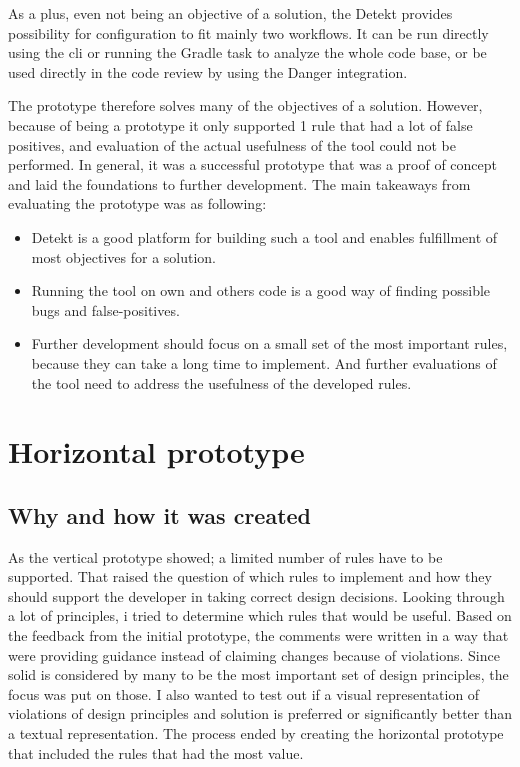 \documentclass{report}
\begin{document}
As a plus, even not being an objective of a solution, the Detekt provides possibility for configuration to fit mainly two workflows. It can be run directly using the \gls{cli} or running the Gradle task to analyze the whole code base, or be used directly in the code review by using the Danger integration.

The prototype therefore solves many of the objectives of a solution. However, because of being a prototype it only supported 1 rule that had a lot of false positives, and evaluation of the actual usefulness of the tool could not be performed. In general, it was a successful prototype that was a proof of concept and laid the foundations to further development. The main takeaways from evaluating the prototype was as following:
\begin{itemize}
    \item Detekt is a good platform for building such a tool and enables fulfillment of most objectives for a solution.
    \item Running the tool on own and others code is a good way of finding possible bugs and false-positives.
    \item Further development should focus on a small set of the most important rules, because they can take a long time to implement. And further evaluations of the tool need to address the usefulness of the developed rules.
\end{itemize}

\section{Horizontal prototype}

\subsection*{Why and how it was created}
As the vertical prototype showed; a limited number of rules have to be supported. That raised the question of which rules to implement and how they should support the developer in taking correct design decisions. Looking through a lot of principles, i tried to determine which rules that would be useful. Based on the feedback from the initial prototype, the comments were written in a way that were providing guidance instead of claiming changes because of violations. Since \gls{solid} is considered by many to be the most important set of design principles, the focus was put on those. I also wanted to test out if a visual representation of violations of design principles and solution is preferred or significantly better than a textual representation. The process ended by creating the horizontal prototype that included the rules that had the most value. 
\end{document}
